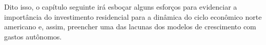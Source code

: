 
  Dito isso,  o capítulo seguinte irá esboçar alguns esforços para evidenciar a importância do investimento residencial para a dinâmica do ciclo econômico norte americano e, assim, preencher uma das lacunas dos modelos de crescimento com gastos autônomos.






